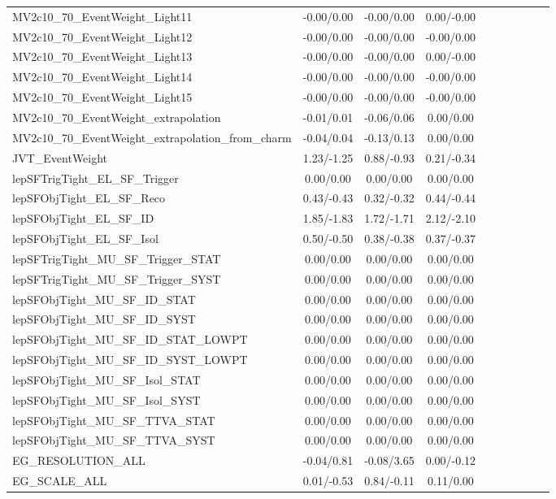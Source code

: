 \begin{table}[h]
\begin{center}
\begin{tabular}{l|ccccccccc}
MV2c10\_70\_EventWeight\_Light11 &-0.00/0.00 &-0.00/0.00 &0.00/-0.00 \\
MV2c10\_70\_EventWeight\_Light12 &-0.00/0.00 &-0.00/0.00 &-0.00/0.00 \\
MV2c10\_70\_EventWeight\_Light13 &-0.00/0.00 &-0.00/0.00 &0.00/-0.00 \\
MV2c10\_70\_EventWeight\_Light14 &-0.00/0.00 &-0.00/0.00 &-0.00/0.00 \\
MV2c10\_70\_EventWeight\_Light15 &-0.00/0.00 &-0.00/0.00 &-0.00/0.00 \\
MV2c10\_70\_EventWeight\_extrapolation &-0.01/0.01 &-0.06/0.06 &0.00/0.00 \\
MV2c10\_70\_EventWeight\_extrapolation\_from\_charm &-0.04/0.04 &-0.13/0.13 &0.00/0.00 \\
JVT\_EventWeight &1.23/-1.25 &0.88/-0.93 &0.21/-0.34 \\
lepSFTrigTight\_EL\_SF\_Trigger &0.00/0.00 &0.00/0.00 &0.00/0.00 \\
lepSFObjTight\_EL\_SF\_Reco &0.43/-0.43 &0.32/-0.32 &0.44/-0.44 \\
lepSFObjTight\_EL\_SF\_ID &1.85/-1.83 &1.72/-1.71 &2.12/-2.10 \\
lepSFObjTight\_EL\_SF\_Isol &0.50/-0.50 &0.38/-0.38 &0.37/-0.37 \\
lepSFTrigTight\_MU\_SF\_Trigger\_STAT &0.00/0.00 &0.00/0.00 &0.00/0.00 \\
lepSFTrigTight\_MU\_SF\_Trigger\_SYST &0.00/0.00 &0.00/0.00 &0.00/0.00 \\
lepSFObjTight\_MU\_SF\_ID\_STAT &0.00/0.00 &0.00/0.00 &0.00/0.00 \\
lepSFObjTight\_MU\_SF\_ID\_SYST &0.00/0.00 &0.00/0.00 &0.00/0.00 \\
lepSFObjTight\_MU\_SF\_ID\_STAT\_LOWPT &0.00/0.00 &0.00/0.00 &0.00/0.00 \\
lepSFObjTight\_MU\_SF\_ID\_SYST\_LOWPT &0.00/0.00 &0.00/0.00 &0.00/0.00 \\
lepSFObjTight\_MU\_SF\_Isol\_STAT &0.00/0.00 &0.00/0.00 &0.00/0.00 \\
lepSFObjTight\_MU\_SF\_Isol\_SYST &0.00/0.00 &0.00/0.00 &0.00/0.00 \\
lepSFObjTight\_MU\_SF\_TTVA\_STAT &0.00/0.00 &0.00/0.00 &0.00/0.00 \\
lepSFObjTight\_MU\_SF\_TTVA\_SYST &0.00/0.00 &0.00/0.00 &0.00/0.00 \\
EG\_RESOLUTION\_ALL &-0.04/0.81 &-0.08/3.65 &0.00/-0.12 \\
EG\_SCALE\_ALL &0.01/-0.53 &0.84/-0.11 &0.11/0.00 \\

\end{tabular}
\end{center}
\end{table}
